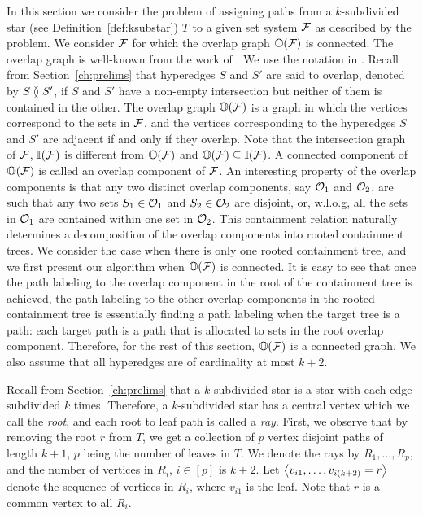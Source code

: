 In this section we consider the problem of assigning paths from a
$k$-subdivided star (see Definition~\ref{def:ksubstar}) $T$ to a given
set system ${\cal F}$ as described by the \CFTPLKTREE problem.  We consider
${\cal F}$ for which the overlap graph $\mathbb O({\cal F})$ is connected.  The
overlap graph is well-known from the work of
\cite{kklv10,nsnrs09,wlh02}.  We use the notation in
\cite{kklv10}. Recall from Section~\ref{ch:prelims} that hyperedges
$S$ and $S'$ are said to overlap, denoted by $S \between S'$, if $S$
and $S'$ have a non-empty intersection but neither of them is
contained in the other. The overlap graph $\mathbb O({\cal F})$ is a graph in
which the vertices correspond to the sets in ${\cal F}$, and the vertices
corresponding to the hyperedges $S$ and $S'$ are adjacent if and only
if they overlap.  Note that the intersection graph of ${\cal F}$,
$\mathbb I({\cal F})$ is different from $\mathbb O({\cal F})$ and $\mathbb O({\cal F}) \subseteq
\mathbb I({\cal F})$.  A connected component of $\mathbb O({\cal F})$ is called an overlap
component of ${\cal F}$.  An interesting property of the overlap components
is that any two distinct overlap components, say ${\cal O}_1$ and ${\cal O}_2$,
are such that any two sets $S_1 \in {\cal O}_1$ and $S_2 \in {\cal O}_2$ are
disjoint, or, w.l.o.g, all the sets in ${\cal O}_1$ are contained within
one set in ${\cal O}_2$.  This containment relation naturally determines a
decomposition of the overlap components into rooted containment trees.
We consider the case when there is only one rooted containment tree,
and we first present our algorithm when $\mathbb O({\cal F})$ is connected.  It
is easy to see that once the path labeling to the overlap component in
the root of the containment tree is achieved, the path labeling to the
other overlap components in the rooted containment tree is essentially
finding a path labeling when the target tree is a path: each target
path is a path that is allocated to sets in the root overlap
component.  Therefore, for the rest of this section, $\mathbb O({\cal F})$ is a
connected graph. We also assume that all hyperedges are of cardinality
at most $k+2$.

Recall from Section~\ref{ch:prelims} that a $k$-subdivided star is a
star with each edge subdivided $k$ times. Therefore, a $k$-subdivided
star has a central vertex which we call the {\em root}, and each root
to leaf path is called a {\em ray}. First, we observe that by removing
the root $r$ from $T$, we get a collection of $p$ vertex disjoint
paths of length $k+1$, $p$ being the number of leaves in $T$.  We
denote the rays by $R_1, \ldots, R_p$, and the number of vertices in
$R_i$, $i \in [p]$ is $k+2$.  Let $\left\langle v_{i1},\ldots,v_{i(k+2)}=r \right\rangle$
denote the sequence of vertices in $R_i$, where $v_{i1}$ is the
leaf. Note that $r$ is a common vertex to all $R_i$.

